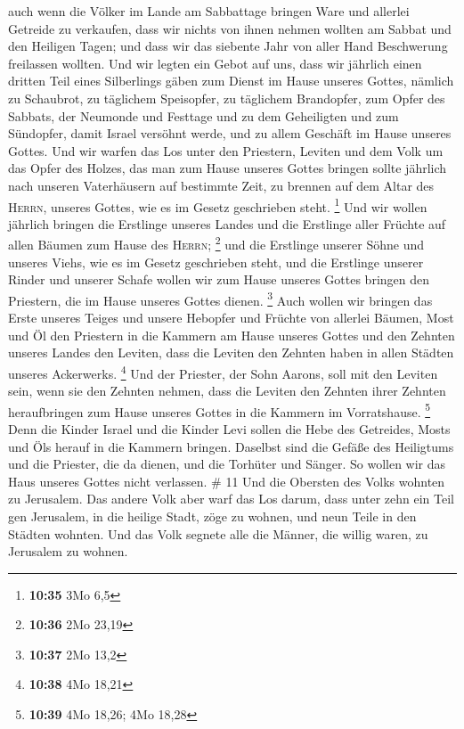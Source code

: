  auch wenn die Völker im Lande am Sabbattage bringen Ware
und allerlei Getreide zu verkaufen, dass wir nichts von ihnen nehmen
wollten am Sabbat und den Heiligen Tagen; und dass wir das siebente Jahr
von aller Hand Beschwerung freilassen wollten.  Und wir
legten ein Gebot auf uns, dass wir jährlich einen dritten Teil eines
Silberlings gäben zum Dienst im Hause unseres Gottes, 
nämlich zu Schaubrot, zu täglichem Speisopfer, zu täglichem Brandopfer,
zum Opfer des Sabbats, der Neumonde und Festtage und zu dem Geheiligten
und zum Sündopfer, damit Israel versöhnt werde, und zu allem Geschäft im
Hause unseres Gottes.  Und wir warfen das Los unter den
Priestern, Leviten und dem Volk um das Opfer des Holzes, das man zum
Hause unseres Gottes bringen sollte jährlich nach unseren Vaterhäusern
auf bestimmte Zeit, zu brennen auf dem Altar des \textsc{Herrn}, unseres
Gottes, wie es im Gesetz geschrieben steht. \footnote{\textbf{10:35} 3Mo
  6,5}  Und wir wollen jährlich bringen die Erstlinge
unseres Landes und die Erstlinge aller Früchte auf allen Bäumen zum
Hause des \textsc{Herrn}; \footnote{\textbf{10:36} 2Mo 23,19}
 und die Erstlinge unserer Söhne und unseres Viehs, wie
es im Gesetz geschrieben steht, und die Erstlinge unserer Rinder und
unserer Schafe wollen wir zum Hause unseres Gottes bringen den
Priestern, die im Hause unseres Gottes dienen. \footnote{\textbf{10:37}
  2Mo 13,2}  Auch wollen wir bringen das Erste unseres
Teiges und unsere Hebopfer und Früchte von allerlei Bäumen, Most und Öl
den Priestern in die Kammern am Hause unseres Gottes und den Zehnten
unseres Landes den Leviten, dass die Leviten den Zehnten haben in allen
Städten unseres Ackerwerks. \footnote{\textbf{10:38} 4Mo 18,21}
 Und der Priester, der Sohn Aarons, soll mit den Leviten
sein, wenn sie den Zehnten nehmen, dass die Leviten den Zehnten ihrer
Zehnten heraufbringen zum Hause unseres Gottes in die Kammern im
Vorratshause. \footnote{\textbf{10:39} 4Mo 18,26; 4Mo 18,28}
 Denn die Kinder Israel und die Kinder Levi sollen die
Hebe des Getreides, Mosts und Öls herauf in die Kammern bringen.
Daselbst sind die Gefäße des Heiligtums und die Priester, die da dienen,
und die Torhüter und Sänger. So wollen wir das Haus unseres Gottes nicht
verlassen. \# 11  Und die Obersten des Volks wohnten zu
Jerusalem. Das andere Volk aber warf das Los darum, dass unter zehn ein
Teil gen Jerusalem, in die heilige Stadt, zöge zu wohnen, und neun Teile
in den Städten wohnten.  Und das Volk segnete alle die
Männer, die willig waren, zu Jerusalem zu wohnen.

